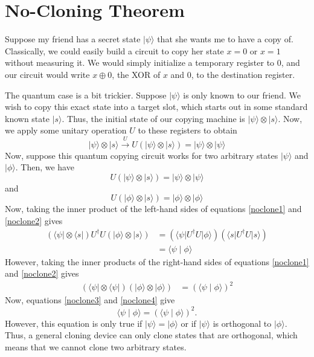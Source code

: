 \documentclass[12pt,twoside]{reedthesis}
\theoremstyle{definition}
\newcommand{\ket}[1]{\ensuremath{\lvert #1\rangle}\xspace}
\newcommand{\bra}[1]{\ensuremath{\langle #1\vert}\xspace}
\newcommand{\inner}[2]{\ensuremath{\langle #1 \mid #2 \rangle}\xspace}
\begin{document}
\section{No-Cloning Theorem}

Suppose my friend has a secret state \ket{\psi} that she wants me to have a copy of.  Classically, we could easily build a circuit to copy her state $x = 0$ or $x = 1$ without measuring it. We would simply initialize a temporary register to 0, and our circuit would write $x \oplus 0$, the XOR of $x$ and 0, to the destination register. 

The quantum case is a bit trickier. Suppose \ket{\psi} is only known to our friend. We wish to copy this exact state into a target slot, which starts out in some standard known state \ket{s}. Thus, the initial state of our copying machine is $\ket{\psi} \otimes \ket{s}$. Now, we apply some unitary operation $U$ to these registers to obtain
\begin{equation}
\ket{\psi} \otimes \ket{s} \xrightarrow{U} U(\ket{\psi} \otimes \ket{s}) = \ket{\psi} \otimes \ket{\psi}
\end{equation}
Now, suppose this quantum copying circuit works for two arbitrary states \ket{\psi} and \ket{\phi}. Then, we have
\begin{equation} \label{noclone1}
U(\ket{\psi} \otimes \ket{s}) = \ket{\psi} \otimes \ket{\psi}
\end{equation}
and
\begin{equation} \label{noclone2}
U(\ket{\phi} \otimes \ket{s}) = \ket{\phi} \otimes \ket{\phi}
\end{equation}
Now, taking the inner product of the left-hand sides of equations \ref{noclone1} and \ref{noclone2} gives
\begin{align} 
(\bra{\psi} \otimes \bra{s})U^{\dagger}U (\ket{\phi} \otimes \ket{s})
& = (\bra{\psi} U^\dagger U \ket{\phi})(\bra{s} U^\dagger U \ket{s}) \\
& = \inner{\psi}{\phi} \label{noclone3}
\end{align}
However, taking the inner products of the right-hand sides of equations \ref{noclone1} and \ref{noclone2} gives
\begin{align} \label{noclone4}
(\bra{\psi} \otimes \bra{\psi})(\ket{\phi} \otimes \ket{\phi})
& = (\inner{\psi}{\phi})^2
\end{align}
Now, equations \ref{noclone3} and \ref{noclone4} give
\begin{equation*}
 \inner{\psi}{\phi} = (\inner{\psi}{\phi})^2.
\end{equation*}
However, this equation is only true if $\ket{\psi} = \ket{\phi}$ or if $\ket{\psi}$ is orthogonal to $\ket{\phi}$. Thus, a general cloning device can only clone states that are orthogonal, which means that we cannot clone two arbitrary states.
\end{document}
